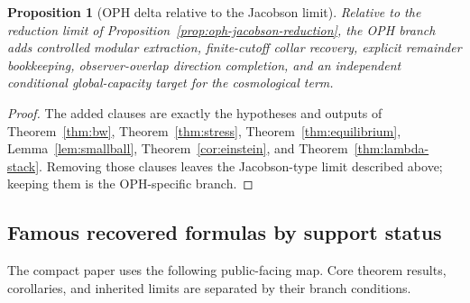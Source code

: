 \documentclass[11pt]{article}
\newtheorem{proposition}[theorem]{Proposition}
\begin{document}
\begin{proposition}[OPH delta relative to the Jacobson limit]\label{prop:oph-jacobson-delta}
Relative to the reduction limit of Proposition~\ref{prop:oph-jacobson-reduction}, the OPH branch
adds controlled modular extraction, finite-cutoff collar recovery, explicit remainder
bookkeeping, observer-overlap direction completion, and an independent conditional global-capacity
target for the cosmological term.
\end{proposition}

\begin{proof}
The added clauses are exactly the hypotheses and outputs of Theorem~\ref{thm:bw},
Theorem~\ref{thm:stress}, Theorem~\ref{thm:equilibrium}, Lemma~\ref{lem:smallball},
Theorem~\ref{cor:einstein}, and Theorem~\ref{thm:lambda-stack}. Removing those clauses leaves
the Jacobson-type limit described above; keeping them is the OPH-specific branch.
\end{proof}

\subsection*{Famous recovered formulas by support status}

The compact paper uses the following public-facing map. Core theorem results, corollaries, and
inherited limits are separated by their branch conditions.
\end{document}
